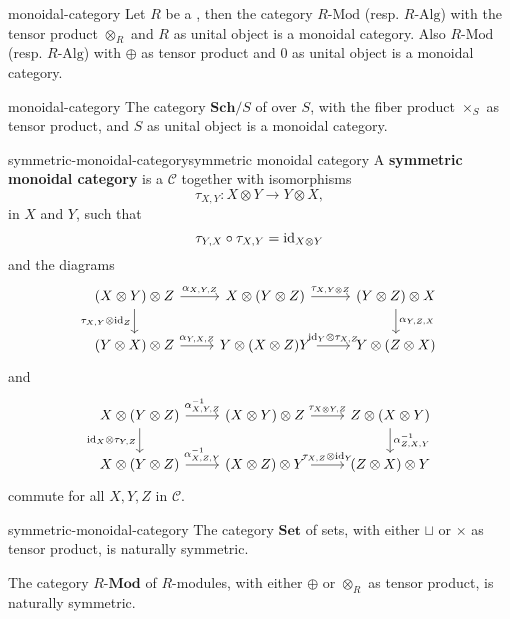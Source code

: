 \begin{example}{monoidal-category}
    Let $R$ be a , then the category $R\text{-Mod}$ (resp. $R\text{-Alg}$) with the tensor product $\otimes_R$ and $R$ as unital object is a monoidal category. Also $R\text{-Mod}$ (resp. $R\text{-Alg}$) with $\oplus$ as tensor product and $0$ as unital object is a monoidal category.
\end{example}

\begin{example}{monoidal-category}
    The category $\textbf{Sch}/S$ of  over $S$, with the fiber product $\times_S$ as tensor product, and $S$ as unital object is a monoidal category.
\end{example}

\begin{topic}{symmetric-monoidal-category}{symmetric monoidal category}
    A \textbf{symmetric monoidal category} is a  $\mathcal{C}$ together with isomorphisms
    \[ \tau_{X, Y} : X \otimes Y \to Y \otimes X , \]
     in $X$ and $Y$, such that
    \[ \tau_{Y, X} \circ \tau_{X, Y} = \text{id}_{X \otimes Y} \]
    and the diagrams
    \[ \begin{tikzcd}
        (X \otimes Y) \otimes Z \arrow{r}{\alpha_{X, Y, Z}} \arrow[swap]{d}{\tau_{X, Y} \otimes \id_Z} & X \otimes (Y \otimes Z) \arrow{r}{\tau_{X, Y \otimes Z}} & (Y \otimes Z) \otimes X \arrow{d}{\alpha_{Y, Z, X}} \\ (Y \otimes X) \otimes Z \arrow{r}{\alpha_{Y, X, Z}} & Y \otimes (X \otimes Z) \arrow{r}{\id_Y \otimes \tau_{X, Z}} Y & Y \otimes (Z \otimes X)
    \end{tikzcd} \]
    and
    \[ \begin{tikzcd}
        X \otimes (Y \otimes Z) \arrow{r}{\alpha^{-1}_{X, Y, Z}} \arrow[swap]{d}{\id_X \otimes \tau_{Y, Z}} & (X \otimes Y) \otimes Z \arrow{r}{\tau_{X \otimes Y, Z}} & Z \otimes (X \otimes Y) \arrow{d}{\alpha^{-1}_{Z, X, Y}} \\ X \otimes (Y \otimes Z) \arrow{r}{\alpha^{-1}_{X, Z, Y}} & (X \otimes Z) \otimes Y \arrow{r}{\tau_{X, Z} \otimes \id_Y} & (Z \otimes X) \otimes Y
    \end{tikzcd} \]
    commute for all $X, Y, Z$ in $\mathcal{C}$.
\end{topic}

\begin{example}{symmetric-monoidal-category}
    The category $\textbf{Set}$ of sets, with either $\sqcup$ or $\times$ as tensor product, is naturally symmetric.
    
    The category $R\text{-}\textbf{Mod}$ of $R$-modules, with either $\oplus$ or $\otimes_R$ as tensor product, is naturally symmetric.
\end{example}

